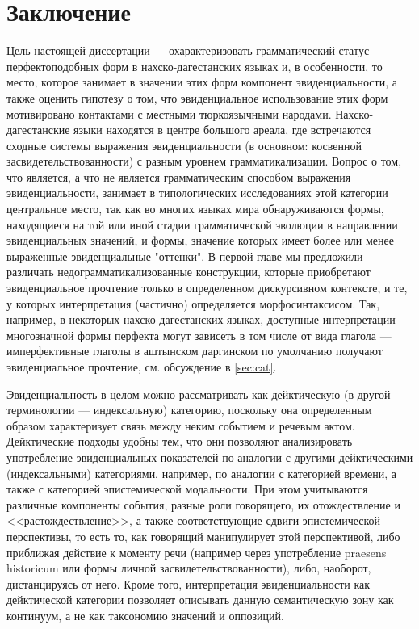 
\chapter*{Заключение}
\pagestyle{plain}

Цель настоящей диссертации --- охарактеризовать грамматический статус перфектоподобных форм в нахско-дагестанских языках и, в особенности, то место, которое занимает в значении этих форм компонент эвиденциальности, а также оценить гипотезу о том, что эвиденциальное использование этих форм мотивировано контактами с местными тюркоязычными народами. Нахско-дагестанские языки находятся в центре большого ареала, где встречаются сходные системы выражения эвиденциальности (в основном: косвенной засвидетельствованности) с разным уровнем грамматикализации. Вопрос о том, что является, а что не является грамматическим способом выражения эвиденциальности, занимает в типологических исследованиях этой категории центральное место, так как во многих языках мира обнаруживаются формы, находящиеся на той или иной стадии грамматической эволюции в направлении эвиденциальных значений, и формы, значение которых имеет более или менее выраженные эвиденциальные "оттенки". В первой главе мы предложили различать недограмматикализованные конструкции, которые приобретают эвиденциальное прочтение только в определенном дискурсивном контексте, и те, у которых интерпретация (частично) определяется морфосинтаксисом. Так, например, в  некоторых нахско-дагестанских языках, доступные интерпретации многозначной формы перфекта могут зависеть в том числе от вида глагола --- имперфективные глаголы в аштынском даргинском по умолчанию получают эвиденциальное прочтение, см. обсуждение в \ref{sec:cat}.
\par Эвиденциальность в целом можно рассматривать как дейктическую (в другой терминологии --- индексальную) категорию, поскольку она определенным образом характеризует связь между неким событием и речевым актом. Дейктические подходы удобны тем, что они позволяют анализировать употребление эвиденциальных показателей по аналогии с другими дейктическими (индексальными) категориями, например, по аналогии с категорией времени, а также с категорией эпистемической модальности. При этом учитываются различные компоненты события, разные роли говорящего, их отождествление и <<растождествление>>, а также соответствующие сдвиги эпистемической перспективы, то есть то, как говорящий манипулирует этой перспективой, либо приближая действие к моменту речи (например через употребление praesens historicum или формы личной засвидетельствованности), либо, наоборот, дистанцируясь от него. Кроме того, интерпретация эвиденциальности как дейктической категории позволяет описывать данную семантическую зону как континуум, а не как таксономию значений и оппозиций. 
